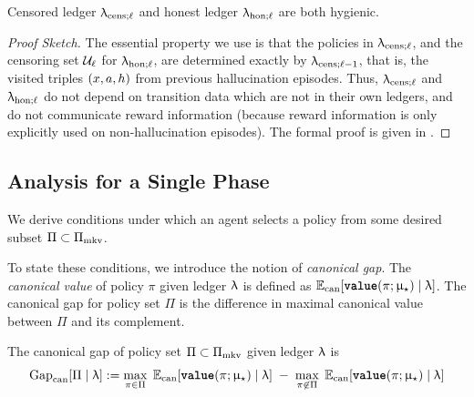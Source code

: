 \begin{lemma}\label{lem:data_hygiene}
Censored ledger $\ledcensl$ and honest ledger $\ledhonl$ are both hygienic.
\end{lemma}

\begin{proof}[Proof Sketch]
The essential property we use is that the policies in $\ledcensl$, and the censoring set $\calU_{\ell}$ for $\ledhonl$, are determined exactly by $\ledcensl[\ell-1]$, that is, the visited triples $\xah$ from previous hallucination episodes. Thus, $\ledcensl$ and $\ledhonl$ do not depend on transition data which are not in their own ledgers, and do not communicate reward information (because reward information is only explicitly used on non-hallucination episodes). The formal proof is given in .
\end{proof}

\subsection{Analysis for a Single Phase}
\label{sec:one_step}


We derive conditions under which an agent selects a policy from some desired subset $\Pi \subset \Pitotal$.




To state these conditions, we introduce the notion of \emph{canonical gap}. The \emph{canonical value} of policy $\pi$ given ledger $\ledger$ is defined as
    $\Expcan[\valuef{\pi}{\modst} \mid \ledger]$.
The canonical gap for policy set $\Pi$ is the difference in maximal canonical value between $\Pi$ and its complement.

\begin{definition}\label{defn:canonical_gap}
The canonical gap of policy set $\Pi \subset \Pimarkov$ given ledger $\ledger$ is
\begin{align*}
\gapcan[\Pi \mid \ledger] :=
    \max_{\pi \in \Pi}\; \Expcan[\valuef{\pi}{\modst} \mid \ledger]
    \;-\;
    \max_{\pi \not\in \Pi}\; \Expcan[\valuef{\pi}{\modst} \mid \ledger]
\end{align*}
\end{definition}

